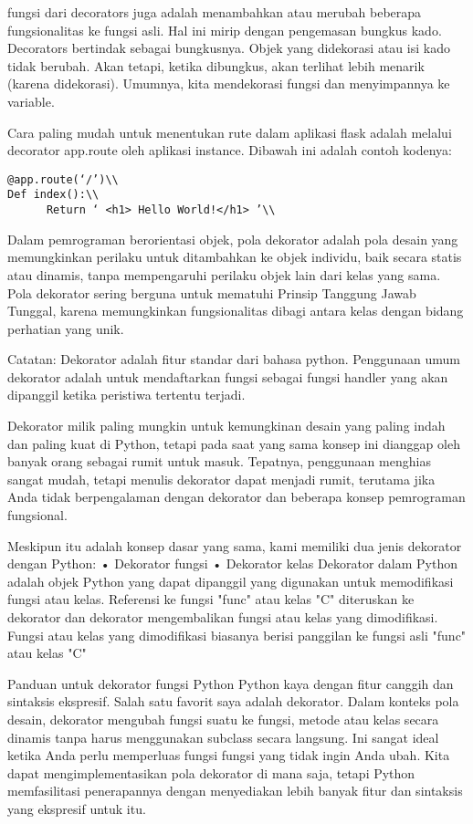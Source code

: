 \documentclass[12pt,a4paper]{article}
\begin{document}
fungsi dari decorators juga adalah menambahkan atau merubah beberapa fungsionalitas ke fungsi asli. Hal ini mirip dengan pengemasan bungkus kado. Decorators bertindak sebagai bungkusnya. Objek yang didekorasi atau isi kado tidak berubah. Akan tetapi, ketika dibungkus, akan terlihat lebih menarik (karena didekorasi). Umumnya, kita mendekorasi fungsi dan menyimpannya ke variable.

Cara paling mudah untuk menentukan rute dalam aplikasi flask adalah melalui decorator app.route oleh aplikasi instance. Dibawah ini adalah contoh kodenya:\\
\begin{verbatim}
@app.route(‘/’)\\
Def index():\\
      Return ‘ <h1> Hello World!</h1> ’\\
\end{verbatim}

Dalam pemrograman berorientasi objek, pola dekorator adalah pola desain yang memungkinkan perilaku untuk ditambahkan ke objek individu, baik secara statis atau dinamis, tanpa mempengaruhi perilaku objek lain dari kelas yang sama. Pola dekorator sering berguna untuk mematuhi Prinsip Tanggung Jawab Tunggal, karena memungkinkan fungsionalitas dibagi antara kelas dengan bidang perhatian yang unik.

Catatan:
Dekorator adalah fitur standar dari bahasa python. Penggunaan umum dekorator adalah untuk mendaftarkan fungsi sebagai fungsi handler yang akan dipanggil ketika peristiwa tertentu terjadi.

Dekorator milik paling mungkin untuk kemungkinan desain yang paling indah dan paling kuat di Python, tetapi pada saat yang sama konsep ini dianggap oleh banyak orang sebagai rumit untuk masuk. Tepatnya, penggunaan menghias sangat mudah, tetapi menulis dekorator dapat menjadi rumit, terutama jika Anda tidak berpengalaman dengan dekorator dan beberapa konsep pemrograman fungsional. 

Meskipun itu adalah konsep dasar yang sama, kami memiliki dua jenis dekorator dengan Python:
•	Dekorator fungsi
•	Dekorator kelas
Dekorator dalam Python adalah objek Python yang dapat dipanggil yang digunakan untuk memodifikasi fungsi atau kelas. Referensi ke fungsi "func" atau kelas "C" diteruskan ke dekorator dan dekorator mengembalikan fungsi atau kelas yang dimodifikasi. Fungsi atau kelas yang dimodifikasi biasanya berisi panggilan ke fungsi asli "func" atau kelas 
"C"


Panduan untuk dekorator fungsi Python
Python kaya dengan fitur canggih dan sintaksis ekspresif. Salah satu favorit saya adalah dekorator. Dalam konteks pola desain, dekorator mengubah fungsi suatu ke fungsi, metode atau kelas secara dinamis tanpa harus menggunakan subclass secara langsung. Ini sangat ideal ketika Anda perlu memperluas fungsi fungsi yang tidak ingin Anda ubah. Kita dapat mengimplementasikan pola dekorator di mana saja, tetapi Python memfasilitasi penerapannya dengan menyediakan lebih banyak fitur dan sintaksis yang ekspresif untuk itu.
\end{document}
